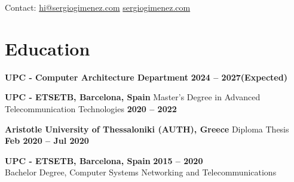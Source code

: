 \documentclass{resume}
\begin{document}
\begin{center}
    \contact
        {Contact:} %
        {\href{mailto:hi@sergiogimenez.com}{hi@sergiogimenez.com}} %
        {\href{https://sergiogimenez.com}{sergiogimenez.com}} %
\end{center}

\section{Education}
\begin{content}
    {\bf UPC - Computer Architecture Department} \hfill {\bf 2024 -- 2027(Expected)} 


    {\bf UPC - ETSETB, Barcelona, Spain} {Master's Degree in Advanced Telecommunication Technologies} \hfill {\bf 2020 -- 2022} %

    {\bf Aristotle University of Thessaloniki (AUTH), Greece} {Diploma Thesis} \hfill {\bf Feb 2020 -- Jul 2020} %

    {\bf UPC - ETSETB, Barcelona, Spain} \hfill {\bf 2015 -- 2020} \\ %
    {Bachelor Degree, Computer Systems Networking and Telecommunications} \hfill %

\sectionlineskip
\end{content}

\end{document}
